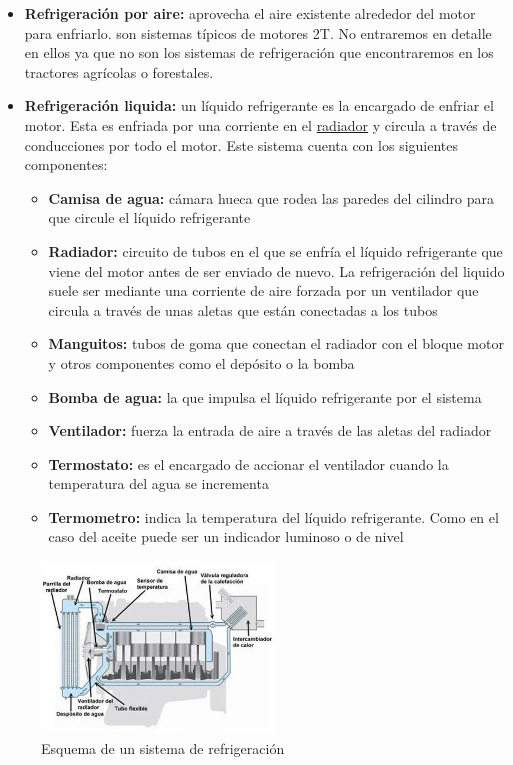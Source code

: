 \documentclass[a4paper,12pt,oneside]{book}
\begin{document}
\begin{itemize}
\item \textbf{Refrigeración por aire:} aprovecha el aire existente alrededor del motor para
enfriarlo. son sistemas típicos de motores 2T. No entraremos en detalle en
ellos ya que no son los sistemas de refrigeración que encontraremos en los
tractores agrícolas o forestales.
\item \textbf{Refrigeración liquida:} un líquido refrigerante es la encargado de enfriar el
motor. Esta  es enfriada por una corriente en el \uline{radiador} y circula a través
de  conducciones por todo el motor. Este sistema cuenta con los siguientes
componentes: 
\begin{itemize}
\item \textbf{Camisa de agua:} cámara hueca que rodea las paredes del cilindro para que
circule el líquido refrigerante
\item \textbf{Radiador:} circuito de tubos en el que se enfría el líquido refrigerante
que viene del motor antes de ser enviado de nuevo. La refrigeración del
liquido suele ser mediante una corriente de aire forzada por un ventilador
que circula a través de unas aletas que están conectadas a los tubos
\item \textbf{Manguitos:} tubos de goma que conectan el radiador con el bloque motor y
otros componentes como el depósito o la bomba
\item \textbf{Bomba de agua:} la que impulsa el líquido refrigerante por el sistema
\item \textbf{Ventilador:} fuerza la entrada de aire a través de las aletas del radiador
\item \textbf{Termostato:} es el encargado de accionar el ventilador cuando la
temperatura del agua se incrementa
\item \textbf{Termometro:} indica la temperatura del líquido refrigerante. Como en el
caso del aceite puede ser un indicador luminoso o de nivel
\end{itemize}
\end{itemize}
\begin{figure}[htbp]
\centering
\includegraphics[width=0.55\textwidth]{./img_0009/refrigeracion.jpg}
\caption{Esquema de un sistema de refrigeración}
\end{figure}
\end{document}
